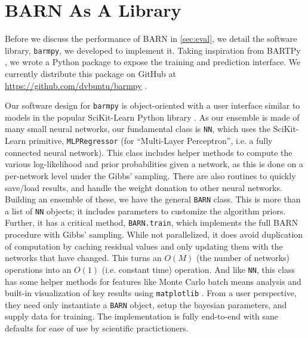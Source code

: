 \documentclass[12pt]{article}
\begin{document}
\section{BARN As A Library}\label{sec:leb}

Before we discuss the performance of BARN in \autoref{sec:eval}, we detail the software library, \texttt{barmpy}, we developed to implement it.  Taking inspiration from BARTPy \cite{coltman2020bartpy}, we wrote a Python package to expose the training and prediction interface.  We currently distribute this package on GitHub at \url{https://github.com/dvbuntu/barmpy} \cite{vanboxel2023barmpy}.

Our software design for \texttt{barmpy} is object-oriented with a user interface similar to models in the popular SciKit-Learn Python library \cite{scikit-learn}.  As our ensemble is made of many small neural networks, our fundamental class is \texttt{NN}, which uses the SciKit-Learn primitive, \texttt{MLPRegressor} (for ``Multi-Layer Perceptron'', i.e. a fully connected neural network).  This class includes helper methods to compute the various log-likelihood and prior probabilities given a network, as this is done on a per-network level under the Gibbs' sampling.  There are also routines to quickly save/load results, and handle the weight donation to other neural networks.  Building an ensemble of these, we have the general \texttt{BARN} class.  This is more than a list of \texttt{NN} objects; it includes parameters to customize the algorithm priors.  Further, it has a critical method, \texttt{BARN.train}, which implements the full BARN procedure with Gibbs' sampling.  While not parallelized, it does avoid duplication of computation by caching residual values and only updating them with the networks that have changed.  This turns an $O(M)$ (the number of networks) operations into an $O(1)$ (i.e. constant time) operation.  And like \texttt{NN}, this class has some helper methods for features like Monte Carlo batch means analysis and built-in visualization of key results using \texttt{matplotlib} \cite{Hunter:2007}.  From a user perspective, they need only instantiate a \texttt{BARN} object, setup the bayesian parameters, and supply data for training.  The implementation is fully end-to-end with sane defaults for ease of use by scientific practictioners.
\end{document}
